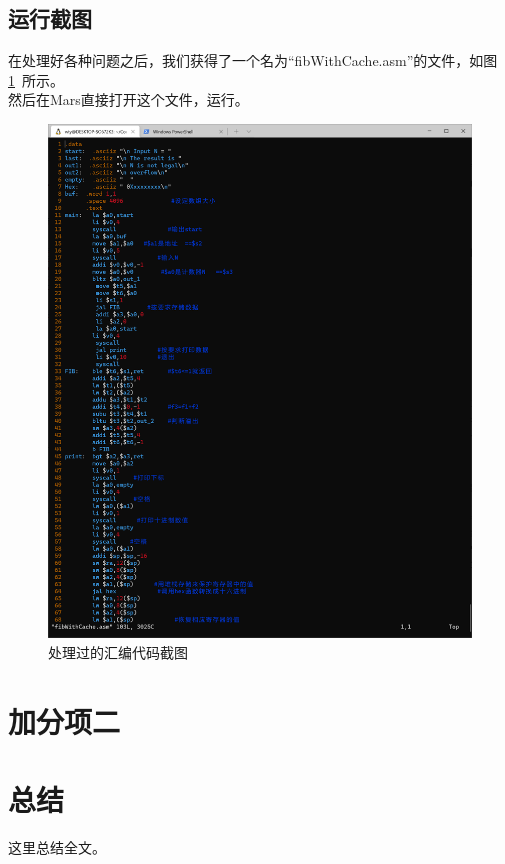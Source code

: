 \documentclass[12pt]{article} %
\begin{document}
\subsection{运行截图}
在处理好各种问题之后，我们获得了一个名为“fibWithCache.asm”的文件，如图\ref{fig:ExtraProCSource2}\ 所示。\\
然后在Mars直接打开这个文件，运行。
\begin{figure}[ht]
	\centering
	\includegraphics[width=\textwidth]{figures/figure3.png}
	\caption{处理过的汇编代码截图}
	\label{fig:ExtraProCSource2}
\end{figure}
\section{加分项二}

\section{总结}
这里总结全文。


\end{document}

